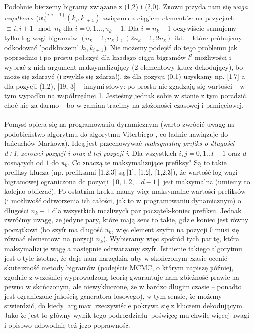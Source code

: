 \documentclass[a4paper]{article}
\DeclareMathOperator*{\argmax}{arg\,max}
\theoremstyle{defn}
\theoremstyle{theorem}
\theoremstyle{lemma}
\theoremstyle{cor}
\theoremstyle{fact}
\begin{document}
Podobnie bierzemy bigramy związane z (1,2) i (2,0). Znowu przyda nam się \textit{waga cząstkowa} ($w_2^{(i, i+1)}(k_i, k_{i+1})$  związana z ciągiem elementów na pozycjach $\equiv i, i+1 \mod n_k$ dla $i=0,1...,n_k-1$. Dla $i=n_k-1$ oczywiście sumujemy tylko log-wagi bigramów $(n_k-1, n_k)$, $(2n_k-1, 2n_k)$ itd. – które próbujemy odkodować 'podkluczem' $k_i, k_{i+1}$). Nie możemy podejść do tego problemu jak poprzednio i po prostu policzyć dla każdego ciągu bigramów $l^2$ możliwości i wybrać z nich argument maksymalizujący (2-elementowy klucz dekodujący), bo może się zdarzyć (i zwykle się zdarza!), że dla pozycji (0,1) uzyskamy np. [1,7] a dla pozycji (1,2), [19, 3] – innymi słowy: po prostu nie zgadzają się wartości – w tym wypadku na współrzędnej 1. Jesteśmy jednak sobie w stanie z tym poradzić, choć nie za darmo – bo w zamian tracimy na złożoności czasowej i pamięciowej. \\\\
Pomysł opiera się na programowaniu dynamicznym (warto zwrócić uwagę na podobieństwo algorytmu do algorytmu Viterbiego \cite{viterbi}, co ładnie nawiązuje do łańcuchów Markowa). Ideą jest przechowywać \textit{maksymalny prefiks o długości d+1, zerowej pozycji i oraz d-tej pozycji j}. Dla wszystkich $i,j=0,1...l-1$ oraz $d$ rosnących od $1$ do $n_k$. Co znaczą te maksymalizujące prefiksy? Są to takie prefiksy klucza (np. prefiksami [1,2,3] są [1], [1,2], [1,2,3]), że wartość log-wagi bigramowej ograniczona do pozycji $[0,1,2,...d-1]$ jest maksymalna (umiemy to kolejno obliczać). Po ostatnim kroku mamy więc maksymalne wartości prefiksów (i możliwość odtworzenia ich całości, jak to w programowaniu dynamicznym) o długości $n_k+1$ dla wszystkich możliwych par początek-koniec prefiksu. Jednak zwróćmy uwagę, że jedyne pary, które mają sens to takie, gdzie koniec jest równy początkowi (bo szyfr ma długość $n_k$, więc element szyfru na pozycji $0$ musi się równać elementowi na pozycji $n_k$). Wybieramy więc spośród tych par tę, która maksymalizuje wagę a następnie odtwarzamy szyfr. Istnienie takiego algorytmu jest o tyle istotne, że daje nam narzędzia, aby w skończonym czasie ocenić skuteczność metody bigramów (podejście MCMC, o którym napiszę później, zgodnie z wcześniej wyprowadzoną teorią gwarantuje nam zbieżność prawie na pewno w skończonym, ale niewykluczone, że w bardzo długim czasie – ponadto jest ograniczone jakością generatora losowego), w tym sensie, że możemy stwierdzić, do kiedy $\argmax$ rzeczywiście pokrywa się z kluczem dekodującym. Jako że jest to główny wynik tego podrozdziału, poświęcę mu chwilę więcej uwagi i opisowo udowodnię też jego poprawność.\\
\end{document}
